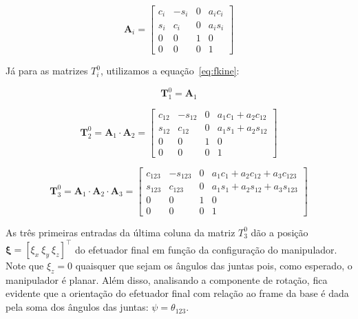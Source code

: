\begin{equation}
    \mathbf{A}_i = \begin{bmatrix}
        c_i & -s_i & 0 & a_i c_i \\
        s_i & c_i  & 0 & a_i s_i \\
        0   & 0    & 1 & 0       \\
        0   & 0    & 0 & 1
    \end{bmatrix}
\end{equation}

Já para as matrizes \(T^0_i\), utilizamos a equação~\ref{eq:fkine}:

\begin{equation}
    \mathbf{T}^0_1 = \mathbf{A}_1
\end{equation}

\begin{equation}
    \mathbf{T}^0_2 = \mathbf{A}_1 \cdot \mathbf{A}_2 = \begin{bmatrix}
        c_{12} & -s_{12} & 0 & a_1c_1 + a_2c_{12} \\
        s_{12} & c_{12}  & 0 & a_1s_1 + a_2s_{12} \\
        0      & 0       & 1 & 0                  \\
        0      & 0       & 0 & 1
    \end{bmatrix}
\end{equation}

\begin{equation}
    \mathbf{T}^0_3 = \mathbf{A}_1 \cdot \mathbf{A}_2 \cdot \mathbf{A}_3 = \begin{bmatrix}
        c_{123} & -s_{123} & 0 & a_1c_1 + a_2c_{12} + a_3c_{123} \\
        s_{123} & c_{123}  & 0 & a_1s_1 + a_2s_{12} + a_3s_{123} \\
        0       & 0        & 1 & 0                               \\
        0       & 0        & 0 & 1
    \end{bmatrix}
\end{equation}

As três primeiras entradas da última coluna da matriz \(T^0_3\) dão a posição
\(\mathbf{\xi} = {\left[ \xi_x \ \xi_y \ \xi_z \right]}^{\top}\) do efetuador final em função
da configuração do manipulador. Note que $\xi_z = 0$ quaisquer que sejam os
ângulos das juntas pois, como esperado, o manipulador é planar. Além disso,
analisando a componente de rotação, fica evidente que a orientação do efetuador
final com relação ao frame da base é dada pela soma dos ângulos das juntas:
$\psi = \theta_{123}$.

